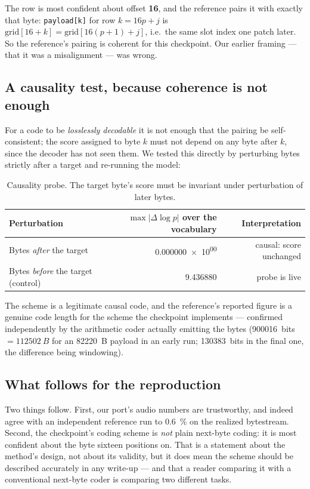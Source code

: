\documentclass[11pt,a4paper]{article}
\newcommand{\code}[1]{\texttt{\small #1}}
\begin{document}
The row is most confident about offset \textbf{16}, and the reference pairs it
with exactly that byte: \code{payload[k]} for row $k = 16p+j$ is
$\mathrm{grid}[16 + k] = \mathrm{grid}[16(p+1) + j]$, i.e.\ the same slot index
one patch later. So the reference's pairing is coherent for this checkpoint. Our
earlier framing --- that it was a misalignment --- was wrong.

\subsection{A causality test, because coherence is not enough}

For a code to be \emph{losslessly decodable} it is not enough that the pairing be
self-consistent; the score assigned to byte $k$ must not depend on any byte after
$k$, since the decoder has not seen them. We tested this directly by perturbing
bytes strictly after a target and re-running the model:

\begin{table}[htbp]
\centering
\small
\caption{Causality probe. The target byte's score must be invariant under
perturbation of later bytes.}
\label{tab:causal}
\begin{tabular}{lrr}
\toprule
Perturbation & $\max|\Delta \log p|$ over the vocabulary & Interpretation \\
\midrule
Bytes \emph{after} the target & \num{0.000000e+00} & causal: score unchanged \\
Bytes \emph{before} the target (control) & \num{9.436880} & probe is live \\
\bottomrule
\end{tabular}
\end{table}

The scheme is a legitimate causal code, and the reference's reported figure is a
genuine code length for the scheme the checkpoint implements --- confirmed
independently by the arithmetic coder actually emitting the bytes
(\SI{900016}{bits} $= \SI{112502}{B}$ for an \SI{82220}{B} payload in an early
run; \SI{130383}{bits} in the final one, the difference being windowing).

\subsection{What follows for the reproduction}

Two things follow. First, our port's audio numbers are trustworthy, and indeed
agree with an independent reference run to \SI{0.6}{\%} on the realized
bytestream. Second, the checkpoint's coding scheme is \emph{not} plain next-byte
coding: it is most confident about the byte sixteen positions on. That is a
statement about the method's design, not about its validity, but it does mean the
scheme should be described accurately in any write-up --- and that a reader
comparing it with a conventional next-byte coder is comparing two different
tasks.
\end{document}
